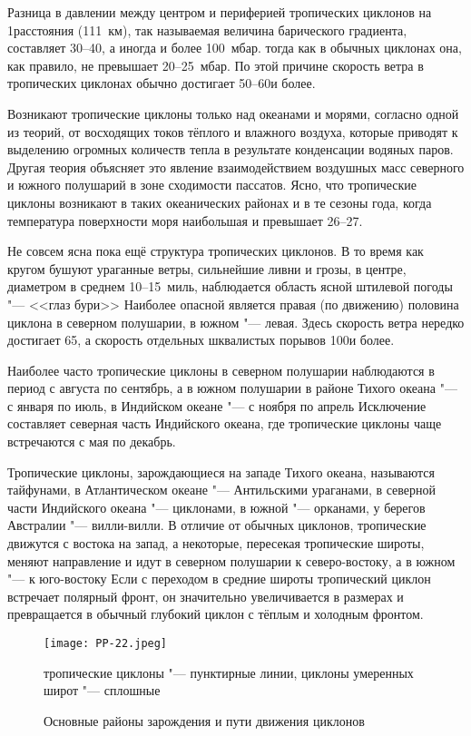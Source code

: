 Разница в давлении между центром и периферией тропических циклонов на
1\gr расстояния (111~км), так называемая величина барического градиента,
составляет 30--40, а иногда и более 100~мбар. тогда как в обычных
циклонах она, как правило, не превышает 20--25~мбар. По этой причине
скорость ветра в тропических циклонах обычно достигает 50--60\speedms и
более.

Возникают тропические циклоны только над океанами и морями, согласно
одной из теорий, от восходящих токов тёплого и влажного воздуха,
которые приводят к выделению огромных количеств тепла в результате
конденсации водяных паров. Другая теория объясняет это явление
взаимодействием воздушных масс северного и южного полушарий в зоне
сходимости пассатов. Ясно, что тропические циклоны возникают в таких
океанических районах и в те сезоны года, когда температура поверхности
моря наибольшая и превышает 26--27\grC.

Не совсем ясна пока ещё структура тропических циклонов. В то время как
кругом бушуют ураганные ветры, сильнейшие ливни и грозы, в центре,
диаметром в среднем 10--15~миль, наблюдается область ясной штилевой
погоды "--- <<глаз бури>> Наиболее опасной является правая (по движению)
половина циклона в северном полушарии, в южном "--- левая. Здесь скорость
ветра нередко достигает 65\speedms, а скорость отдельных шквалистых
порывов 100\speedms и более.

Наиболее часто тропические циклоны в северном полушарии наблюдаются в
период с августа по сентябрь, а в южном полушарии в районе Тихого
океана "--- с января по июль, в Индийском океане "--- с ноября по апрель
Исключение составляет северная часть Индийского океана, где
тропические циклоны чаще встречаются с мая по декабрь.

Тропические циклоны, зарождающиеся на западе Тихого океана, называются
тайфунами, в Атлантическом океане "--- Антильскими ураганами, в северной
части Индийского океана "--- циклонами, в южной "--- орканами, у берегов
Австралии "--- вилли-вилли. В отличие от обычных циклонов, тропические
движутся с востока на запад, а некоторые, пересекая тропические
широты, меняют направление и идут в северном полушарии к
северо-востоку, а в южном "--- к юго-востоку Если с переходом в средние
широты тропический циклон встречает полярный фронт, он значительно
увеличивается в размерах и превращается в обычный глубокий циклон с
тёплым и холодным фронтом.

\begin{figure}[htb]
  \centering{}
  \texttt{[image: PP-22.jpeg]}
  \caption{Основные районы зарождения и пути движения циклонов}
  \label{fig:pp22}
  \small
  \centering{}
  тропические циклоны "--- пунктирные линии, циклоны умеренных широт "--- сплошные
\end{figure}


